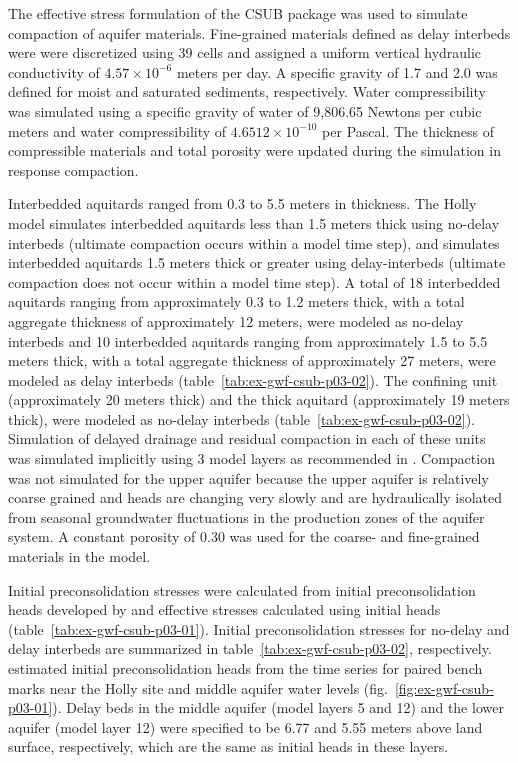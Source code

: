 The effective stress formulation of the CSUB package was used to simulate compaction of aquifer materials.  Fine-grained materials defined as delay interbeds were were discretized using 39 cells and assigned a uniform vertical hydraulic conductivity of $4.57 \times 10^{-6}$ meters per day. A specific gravity of 1.7 and 2.0 was defined for moist and saturated sediments, respectively. Water compressibility was simulated using a specific gravity of water of 9,806.65 Newtons per cubic meters and water compressibility of $4.6512 \times 10^{-10}$ per Pascal. The thickness of compressible materials and total porosity were updated during the simulation in response compaction.

Interbedded aquitards ranged from 0.3 to 5.5 meters in thickness. The Holly model simulates interbedded aquitards less than 1.5 meters thick using no-delay interbeds (ultimate compaction occurs within a model time step), and simulates interbedded aquitards 1.5 meters thick or greater using delay-interbeds (ultimate compaction does not occur within a model time step). A total of 18 interbedded aquitards ranging from approximately 0.3 to 1.2 meters thick, with a total aggregate thickness of approximately 12 meters, were modeled as no-delay interbeds and 10 interbedded aquitards ranging from approximately 1.5 to 5.5 meters thick, with a total aggregate thickness of approximately 27 meters, were modeled as delay interbeds (table~\ref{tab:ex-gwf-csub-p03-02}). The confining unit (approximately 20 meters thick) and the thick aquitard (approximately 19 meters thick), were modeled as no-delay interbeds (table~\ref{tab:ex-gwf-csub-p03-02}). Simulation of delayed drainage and residual compaction in each of these units was simulated implicitly using 3 model layers as recommended in \cite{hoffmann2003modflow}. Compaction was not simulated for the upper aquifer because the upper aquifer is relatively coarse grained and heads are changing very slowly and are hydraulically isolated from seasonal groundwater fluctuations in the production zones of the aquifer system. A constant porosity of 0.30 was used for the coarse- and fine-grained materials in the model.

 

Initial preconsolidation stresses were calculated from initial preconsolidation heads developed by \cite{sneed2008} and effective stresses calculated using initial heads (table~\ref{tab:ex-gwf-csub-p03-01}). Initial preconsolidation stresses for no-delay and delay interbeds are summarized in table~\ref{tab:ex-gwf-csub-p03-02}, respectively. \cite{sneed2008} estimated initial preconsolidation heads from the time series for paired bench marks near the Holly site and middle aquifer water levels (fig.~\ref{fig:ex-gwf-csub-p03-01}). Delay beds in the middle aquifer (model layers 5 and 12) and the lower aquifer (model layer 12) were specified to be 6.77 and 5.55 meters above land surface, respectively, which are the same as initial heads in these layers. 

